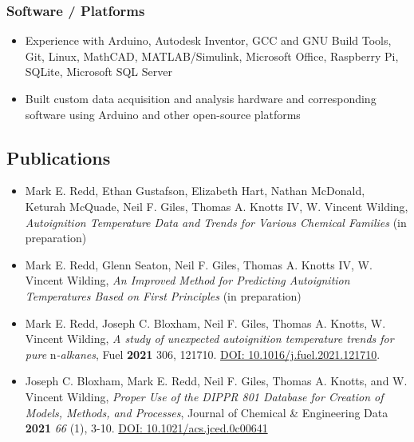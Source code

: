\hypertarget{software-platforms}{%
\subsubsection{Software / Platforms}\label{software-platforms}}

\begin{itemize}
\tightlist
\item
  Experience with Arduino, Autodesk Inventor, GCC and GNU Build Tools,
  Git, Linux, MathCAD, MATLAB/Simulink, Microsoft Office, Raspberry Pi,
  SQLite, Microsoft SQL Server
\item
  Built custom data acquisition and analysis hardware and corresponding
  software using Arduino and other open-source platforms
\end{itemize}

\hypertarget{publications}{%
\subsection{Publications}\label{publications}}


\begin{itemize}
\item
  Mark E. Redd, Ethan Gustafson, Elizabeth Hart, Nathan McDonald,
  Keturah McQuade, Neil F. Giles, Thomas A. Knotts IV, W. Vincent
  Wilding, \emph{Autoignition Temperature Data and Trends for Various
  Chemical Families} (in preparation)
\item
  Mark E. Redd, Glenn Seaton, Neil F. Giles, Thomas A. Knotts IV, W.
  Vincent Wilding, \emph{An Improved Method for Predicting Autoignition
  Temperatures Based on First Principles} (in preparation)
\item
  Mark E. Redd, Joseph C. Bloxham, Neil F. Giles, Thomas A. Knotts, W.
  Vincent Wilding, \emph{A study of unexpected autoignition temperature
  trends for pure} n\emph{-alkanes}, Fuel \textbf{2021} 306, 121710.
  \href{https://doi.org/10.1016/j.fuel.2021.121710}{DOI:
  10.1016/j.fuel.2021.121710}.
\item
  Joseph C. Bloxham, Mark E. Redd, Neil F. Giles, Thomas A. Knotts, and
  W. Vincent Wilding, \emph{Proper Use of the DIPPR 801 Database for
  Creation of Models, Methods, and Processes}, Journal of Chemical \&
  Engineering Data \textbf{2021} \emph{66} (1), 3-10.
  \href{https://doi.org/10.1021/acs.jced.0c00641}{DOI:
  10.1021/acs.jced.0c00641}
\end{itemize}

